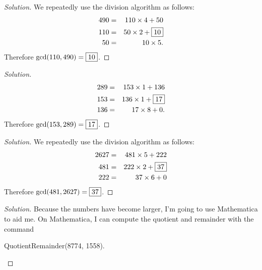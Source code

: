 \begin{proof}[Solution]
	 We repeatedly use the division algorithm as follows: 
	 \begin{eqnarray*} 490&=&110\times 4+50 \\ 110&=&50\times 2+\framebox{10} \\ 50&=&10\times 5.\end{eqnarray*} 
Therefore $\gcd(110, 490)=\framebox{10}$.  \end{proof} 

\clearpage


\begin{proof}[Solution]
		\begin{eqnarray*}  289 &=& 153\times 1+136 \\ 153 &=& 136\times 1+\framebox{17} \\ 136&=& 17\times 8+0. \end{eqnarray*}
Therefore $\gcd(153, 289)=\framebox{17}$.  \end{proof}

\clearpage


\begin{proof}[Solution]
We repeatedly use the division algorithm as follows: 
	\begin{eqnarray*}  
	2627 &=& 481\times 5+222 \\
	481 &=& 222\times 2+\framebox{37} \\
	222 &=& 37\times 6+0 
	\end{eqnarray*}
Therefore $\gcd(481, 2627)=\framebox{37}$. 
\end{proof}

\clearpage


\begin{proof}[Solution]
	
Because the numbers have become larger, I'm going to use Mathematica to aid me. On Mathematica, I can compute the quotient and remainder with the command \begin{center} QuotientRemainder(8774, 1558). \end{center}

\end{proof} 


